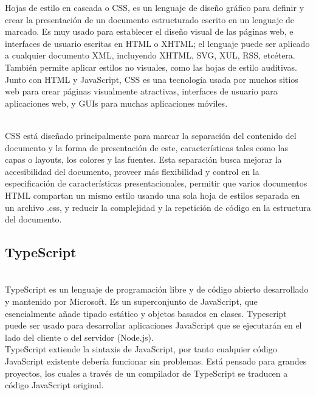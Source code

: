 \documentclass[a4paper, 11pt]{article}
\begin{document}
\begin{itemize}
          Hojas de estilo en cascada o CSS, es un lenguaje de diseño gráfico para
          definir y crear la presentación de un documento estructurado escrito en un
          lenguaje de marcado.​ Es muy usado para establecer el diseño visual de las
          páginas web, e interfaces de usuario escritas en HTML o XHTML; el lenguaje
          puede ser aplicado a cualquier documento XML, incluyendo XHTML, SVG, XUL,
          RSS, etcétera. También permite aplicar estilos no visuales, como las hojas
          de estilo auditivas.\\

          Junto con HTML y JavaScript, CSS es una tecnología usada por muchos sitios
          web para crear páginas visualmente atractivas, interfaces de usuario para
          aplicaciones web, y GUIs para muchas aplicaciones móviles.\\​

          CSS está diseñado principalmente para marcar la separación del contenido
          del documento y la forma de presentación de este, características tales
          como las capas o layouts, los colores y las fuentes. Esta separación
          busca mejorar la accesibilidad del documento, proveer más flexibilidad y
          control en la especificación de características presentacionales, permitir
          que varios documentos HTML compartan un mismo estilo usando una sola hoja
          de estilos separada en un archivo .css, y reducir la complejidad y la
          repetición de código en la estructura del documento.

          \subsection{TypeScript}\\

          TypeScript es un lenguaje de programación libre y de código abierto
          desarrollado y mantenido por Microsoft. Es un superconjunto de JavaScript,
          que esencialmente añade tipado estático y objetos basados en clases.
          Typescript puede ser usado para
          desarrollar aplicaciones JavaScript que se ejecutarán en el lado del
          cliente o del servidor (Node.js).\\

          TypeScript extiende la sintaxis de JavaScript, por tanto cualquier código
          JavaScript existente debería funcionar sin problemas. Está pensado para
          grandes proyectos, los cuales a través de un compilador de TypeScript se
          traducen a código JavaScript original.\\


\end{itemize}
\end{document}
